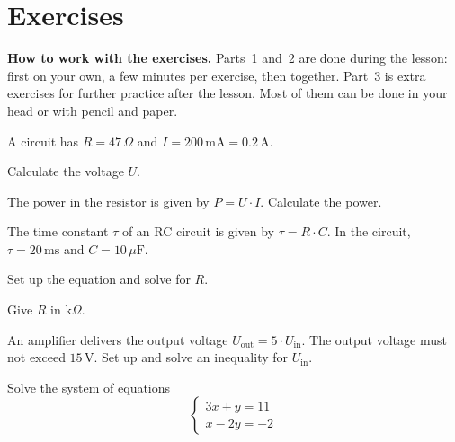
\section{Exercises}
\label{c4:sec:uppgifter}

\begin{aside}
\textbf{How to work with the exercises.} Parts~1 and~2 are done during the lesson: first on your
own, a few minutes per exercise, then together. Part~3 is extra exercises for further practice
after the lesson. Most of them can be done in your head or with pencil and paper.

\end{aside}


A circuit has $R = 47\,\Omega$ and $I = 200\,\text{mA} = 0.2\,\text{A}$.
\begin{parts}
  \item Calculate the voltage $U$.
  \item The power in the resistor is given by $P = U \cdot I$. Calculate the power.
\end{parts}

The time constant $\tau$ of an RC circuit is given by $\tau = R \cdot C$. In the circuit,
$\tau = 20\,\text{ms}$ and $C = 10\,\mu\text{F}$.
\begin{parts}
  \item Set up the equation and solve for $R$.
  \item Give $R$ in $\text{k}\Omega$.
\end{parts}

An amplifier delivers the output voltage $U_{\text{out}} = 5 \cdot U_{\text{in}}$. The output
voltage must not exceed $15\,\text{V}$. Set up and solve an inequality for $U_{\text{in}}$.


Solve the system of equations
\[
  \begin{cases}
    3x + y = 11 \\
    x - 2y = -2
  \end{cases}
\]

